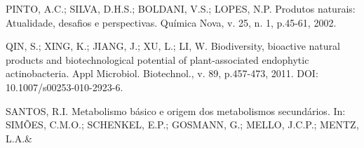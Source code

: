 \documentclass[article,12pt,onesidea,4paper,english,brazil]{abntex2}
\begin{document}
	\noindent PINTO, A.C.; SILVA, D.H.S.; BOLDANI, V.S.; LOPES, N.P. Produtos naturais: Atualidade, desafios e perspectivas. Química Nova, v. 25, n. 1, p.45-61, 2002.
	
	\noindent QIN, S.; XING, K.; JIANG, J.; XU, L.; LI, W. Biodiversity, bioactive natural products and biotechnological potential of plant-associated endophytic actinobacteria. Appl Microbiol. Biotechnol., v. 89, p.457-473, 2011. DOI: 10.1007/s00253-010-2923-6.
	
	\noindent SANTOS, R.I. Metabolismo básico e origem dos metabolismos secundários. In: SIMÕES, C.M.O.; SCHENKEL, E.P.; GOSMANN, G.; MELLO, J.C.P.; MENTZ, L.A.\&
	
	
\end{document}
